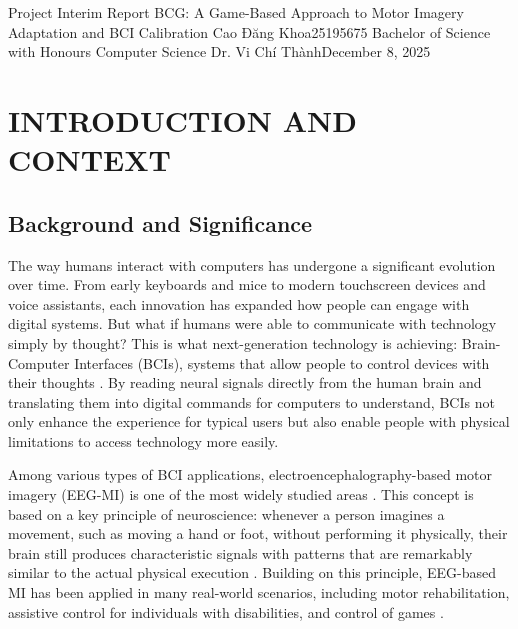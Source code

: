 \documentclass[a4paper, 11pt, openany]{report}
\let\cite\citep
\begin{document}
\reportTitlePage
    {Project Interim Report}
    {BCG: A Game-Based Approach to Motor Imagery Adaptation and BCI Calibration}
    {Cao Đăng Khoa}{25195675}
    {Bachelor of Science with Honours Computer Science}
    {Dr. Vi Chí Thành}{December 8, 2025}
    \thispagestyle{titlepage}

\setcounter{page}{0}

\reportTableOfContents

\reportListOfFigures

\reportListOfTables


\cleardoublepage
{}

\setlength{\parskip}{8pt plus 2pt minus 1pt} 


\vspace*{-1.15cm}
\chapter{INTRODUCTION AND CONTEXT}

    \section{Background and Significance}

    The way humans interact with computers has undergone a significant evolution over time. 
    From early keyboards and mice to modern touchscreen devices and voice assistants, 
    each innovation has expanded how people can engage with digital systems. But what 
    if humans were able to communicate with technology simply by thought? This is what 
    next-generation technology is achieving: Brain-Computer Interfaces (BCIs), systems 
    that allow people to control devices with their thoughts \cite{Birbaumer2006}. By 
    reading neural signals directly from the human brain and translating them into 
    digital commands for computers to understand, BCIs not only enhance the experience 
    for typical users but also enable people with physical limitations to access technology 
    more easily.

    Among various types of BCI applications, electroencephalography-based motor imagery 
    (EEG-MI) is one of the most widely studied areas \cite{Lotte2018}. This concept is 
    based on a key principle of neuroscience: whenever a person imagines a movement,
    such as moving a hand or foot, without performing it physically, their brain still 
    produces characteristic signals with patterns that are remarkably similar to the 
    actual physical execution \cite{Neuper2001}. Building on this principle, EEG-based 
    MI has been applied in many real-world scenarios, including motor rehabilitation, 
    assistive control for individuals with disabilities, and control of games
    \cite{pfurtscheller1999event}.
\end{document}
